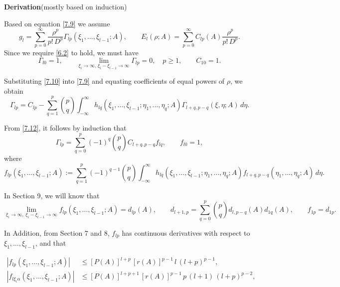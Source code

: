 \documentclass[11pt]{article}
\begin{document}
\bigskip
\noindent
\textbf{Derivation}(mostly based on induction)

Based on equation \eqref{7.9} we assume
\begin{equation}
\label{7.10}\tag{7.10}
g_l
= \sum_{p=0}^\infty \frac{\rho^p}{p!\,D^p}\Gamma_{l p}(\xi_1, \dots, \xi_{l-1}; A),
\qquad
E_l(\rho; A) = \sum_{p=0}^\infty C_{l p}(A)\frac{\rho^p}{p!\,D^p}.
\end{equation}
Since we require \eqref{6.2} to hold, we must have
\begin{equation}
\label{7.11}\tag{7.11}
\Gamma_{l 0} = 1,
\qquad
\lim_{\xi_i \to \infty,\,\xi_i - \xi_{l-1}\to \infty} \Gamma_{l p} = 0,
\quad p \ge 1,
\qquad
C_{1 0} = 1.
\end{equation}

Substituting \eqref{7.10} into \eqref{7.9} and equating coefficients of equal powers of
$\rho$, we obtain
\begin{equation}
\label{7.12}\tag{7.12}
\Gamma_{l p}
= C_{l p} - \sum_{q=1}^{p}
  \binom{p}{q}
  \int_{-\infty}^{\infty}
  h_{l q}(\xi_1, \dots, \xi_{l-1}; \eta_1, \dots, \eta_q; A)
  \Gamma_{l+q, p-q}(\xi, \eta; A)\,d\eta.
\end{equation}

From \eqref{7.12}, it follows by induction that
\begin{equation}
\label{7.13}\tag{7.13}
\Gamma_{l p}
= \sum_{q=0}^{p} (-1)^q \binom{p}{q} C_{l+q, p-q} f_{l q},
\qquad
f_{l 0} = 1,
\end{equation}
where
\[
f_{l p}(\xi_1, \dots, \xi_{l-1}; A)
:= \sum_{q=1}^{p} (-1)^{q-1}\binom{p}{q}
  \int_{-\infty}^{\infty}
  h_{l q}(\xi_1, \dots, \xi_{l-1}; \eta_1, \dots, \eta_q; A)
  f_{l+q, p-q}(\eta_1, \dots, \eta_q; A)\,d\eta.
\]

In \cite{Morrey1955}{Section 9}, we will know that
\begin{equation}
\label{7.14}\tag{7.14}
\lim_{\xi_i\to\infty,\;\xi_i-\xi_{l-1}\to\infty}
  f_{l p}(\xi_1, \dots, \xi_{l-1}; A)
  = d_{l p}(A),
\qquad
d_{l+1, p}
= \sum_{q=0}^p \binom{p}{q} d_{l, p-q}(A)d_{1 q}(A),
\qquad f_{1 p} = d_{1 p}.
\end{equation}

In Addition, from \cite{Morrey1955}{Section 7 and 8}, $f_{l p}$ has continuous derivatives with
respect to $\xi_1,\dots,\xi_{l-1}$, and that

\begin{equation}
\begin{aligned}
|f_{l p}(\xi_1, \dots, \xi_{l-1}; A)|
&\le [P(A)]^{l+p}\,[r(A)]^{p-1}\,l\,(l+p)^{p-1},\\
|f_{l\xi_i\alpha}(\xi_1, \dots, \xi_{l-1}; A)|
&\le [P(A)]^{l+p+1}\,[r(A)]^{p-1}\,p\,(l+1)\,(l+p)^{p-2},
\end{aligned}
\label{7.15}\tag{7.15}
\end{equation}
\end{document}
